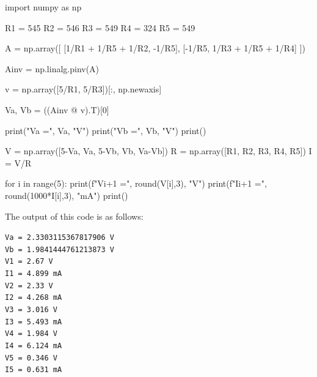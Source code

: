 \documentclass{article}
\begin{document}
\begin{python}
import numpy as np

R1 = 545
R2 = 546
R3 = 549
R4 = 324
R5 = 549

A = np.array([
    [1/R1 + 1/R5 + 1/R2, -1/R5],
    [-1/R5, 1/R3 + 1/R5 + 1/R4]
])

Ainv = np.linalg.pinv(A)

v = np.array([5/R1, 5/R3])[:, np.newaxis]


Va, Vb = ((Ainv @ v).T)[0]

print("Va =", Va, "V")
print("Vb =", Vb, "V")
print()

V = np.array([5-Va, Va, 5-Vb, Vb, Va-Vb])
R = np.array([R1, R2, R3, R4, R5])
I = V/R

for i in range(5):
    print(f"V{i+1} =", round(V[i],3), "V")
    print(f"I{i+1} =", round(1000*I[i],3), "mA")
    print()

\end{python}

The output of this code is as follows:
\begin{tcolorbox}
\texttt{Va = 2.3303115367817906 V} \\
\texttt{Vb = 1.9841444761213873 V} \\
\texttt{V1 = 2.67 V} \\
\texttt{I1 = 4.899 mA} \\
\texttt{V2 = 2.33 V} \\
\texttt{I2 = 4.268 mA} \\
\texttt{V3 = 3.016 V} \\
\texttt{I3 = 5.493 mA} \\
\texttt{V4 = 1.984 V} \\
\texttt{I4 = 6.124 mA} \\
\texttt{V5 = 0.346 V} \\
\texttt{I5 = 0.631 mA} \\
\end{tcolorbox}
\end{document}
